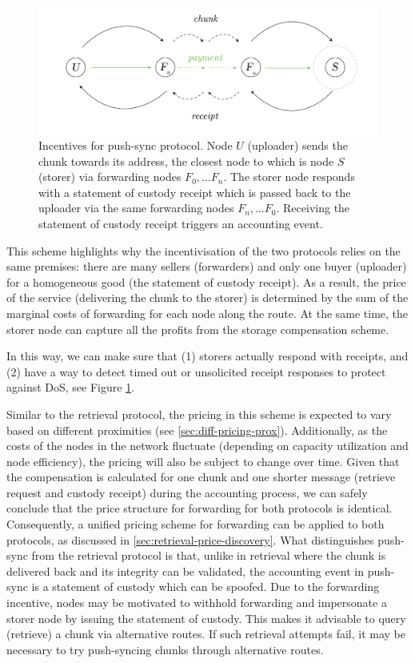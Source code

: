 \begin{figure}[htbp]
\centering
\includegraphics[width=\textwidth]{fig/push-payment.pdf}
\caption[Incentives for push-sync protocol \statusgreen]{Incentives for push-sync protocol. Node $U$ (uploader) sends the chunk towards its address, the closest node to which is node $S$ (storer) via forwarding nodes $F_0, \ldots F_n$. The storer node responds with a statement of custody receipt which is passed back to the uploader via the same forwarding nodes $F_n, \ldots F_0$. Receiving the statement of custody receipt triggers an accounting event.}
\label{fig:syncing-swap}
\end{figure}

This scheme highlights why the incentivisation of the two protocols relies on the same premises: there are many sellers (forwarders) and only one buyer (uploader) for a homogeneous good (the statement of custody receipt). As a result, the price of the service (delivering the chunk to the storer) is determined by the sum of the marginal costs of forwarding for each node along the route. At the same time, the storer node can capture all the profits from the storage compensation scheme.

In this way, we can make sure that (1) storers actually respond with receipts, and (2) have a way to detect timed out or unsolicited receipt responses to protect against DoS, see Figure \ref{fig:syncing-swap}.

Similar to the retrieval protocol, the pricing in this scheme is expected to vary based on different proximities (see \ref{sec:diff-pricing-prox}). Additionally, as the costs of the nodes in the network fluctuate (depending on capacity utilization and node efficiency), the pricing will also be subject to change over time. Given that the compensation is calculated for one chunk and one shorter message (retrieve request and custody receipt) during the accounting process, we can safely conclude that the price structure for forwarding for both protocols is identical. Consequently, a unified pricing scheme for forwarding can be applied to both protocols, as discussed in \ref{sec:retrieval-price-discovery}. 
What distinguishes push-sync from the retrieval protocol is that, unlike in retrieval where the chunk is delivered back and its integrity can be validated, the accounting event in push-sync is a statement of custody which can be spoofed. Due to the forwarding incentive, nodes may be motivated to withhold forwarding and impersonate a storer node by issuing the statement of  custody. This makes it advisable to query (retrieve) a chunk via alternative routes. If  such  retrieval attempts fail, it may be necessary to try push-syncing chunks through alternative routes. 
 

